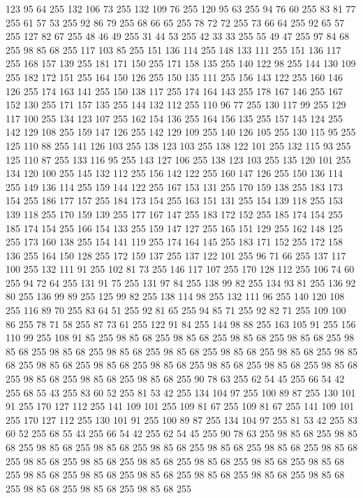 123 95 64 255 132 106 73 255 132 109 76 255 120 95 63 255 94 76 60 255 83 81 77 255 61 57 53 255 92 86 79 255 68 66 65 255 78 72 72 255 73 66 64 255 92 65 57 255 127 82 67 255 48 46 49 255 31 44 53 255 42 33 33 255 55 49 47 255 97 84 68 255 98 85 68 255 117 103 85 255 151 136 114 255 148 133 111 255 151 136 117 255 168 157 139 255 181 171 150 255 171 158 135 255 140 122 98 255 144 130 109 255 182 172 151 255 164 150 126 255 150 135 111 255 156 143 122 255 160 146 126 255 174 163 141 255 150 138 117 255 174 164 143 255 178 167 146 255 167 152 130 255 171 157 135 255 144 132 112 255 110 96 77 255 130 117 99 255 129 117 100 255 134 123 107 255 162 154 136 255 164 156 135 255 157 145 124 255 142 129 108 255 159 147 126 255 142 129 109 255 140 126 105 255 130 115 95 255 125 110 88 255 141 126 103 255 138 123 103 255 138 122 101 255 132 115 93 255 125 110 87 255 133 116 95 255 143 127 106 255 138 123 103 255 135 120 101 255 134 120 100 255 145 132 112 255
156 142 122 255 160 147 126 255 150 136 114 255 149 136 114 255 159 144 122 255 167 153 131 255 170 159 138 255 183 173 154 255 186 177 157 255 184 173 154 255 163 151 131 255 154 139 118 255 153 139 118 255 170 159 139 255 177 167 147 255 183 172 152 255 185 174 154 255 185 174 154 255 166 154 133 255 159 147 127 255 165 151 129 255 162 148 125 255 173 160 138 255 154 141 119 255 174 164 145 255 183 171 152 255 172 158 136 255 164 150 128 255 172 159 137 255 137 122 101 255 96 71 66 255 137 117 100 255 132 111 91 255 102 81 73 255 146 117 107 255 170 128 112 255 106 74 60 255 94 72 64 255 131 91 75 255 131 97 84 255 138 99 82 255 134 93 81 255 136 92 80 255 136 99 89 255 125 99 82 255 138 114 98 255 132 111 96 255 140 120 108 255 116 89 70 255 83 64 51 255 92 81 65 255 94 85 71 255 92 82 71 255 109 100 86 255 78 71 58 255 87 73 61 255 122 91 84 255 144 98 88 255 163 105 91 255 156 110 99 255 108 91 85 255 98 85 68 255 98 85 68 255 98 85 68 255
98 85 68 255 98 85 68 255 98 85 68 255 98 85 68 255 98 85 68 255 98 85 68 255 98 85 68 255 98 85 68 255 98 85 68 255 98 85 68 255 98 85 68 255 98 85 68 255 98 85 68 255 98 85 68 255 98 85 68 255 98 85 68 255 98 85 68 255 90 78 63 255 62 54 45 255 66 54 42 255 68 55 43 255 83 60 52 255 81 53 42 255 134 104 97 255 100 89 87 255 130 101 91 255 170 127 112 255 141 109 101 255 109 81 67 255 109 81 67 255 141 109 101 255 170 127 112 255 130 101 91 255 100 89 87 255 134 104 97 255 81 53 42 255 83 60 52 255 68 55 43 255 66 54 42 255 62 54 45 255 90 78 63 255 98 85 68 255 98 85 68 255 98 85 68 255 98 85 68 255 98 85 68 255 98 85 68 255 98 85 68 255 98 85 68 255 98 85 68 255 98 85 68 255 98 85 68 255 98 85 68 255 98 85 68 255 98 85 68 255 98 85 68 255 98 85 68 255 98 85 68 255 98 85 68 255 98 85 68 255 98 85 68 255 98 85 68 255 98 85 68 255 98 85 68 255
